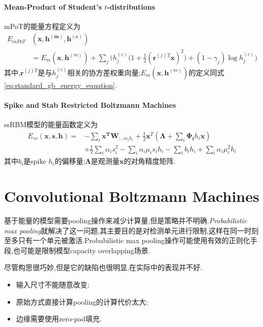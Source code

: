 \paragraph{Mean-Product of Student's $t$-distributions}

mPoT的能量方程定义为
\begin{equation}\begin{split}
E_{mPoT}&(\bm{x,h^{(m)},h^{(c)}})\\
&=E_m(\bm{x,h}^{(m)})+\sum_j\Big(h_j^{(c)}\Big(1+\frac{1}{2}(\bm r^{(j)T}\bm x)^2\Big)+(1-\gamma_j)\log h_j^{(c)}\Big)
\end{split}\end{equation}
其中,$\bm r^{(j)T}$是与$h_j^{(c)}$相关的协方差权重向量;$E_m(\bm{x,h}^{(m)})$的定义同式\ref{eq:standard_gb_energy_equation}.

\paragraph{Spike and Stab Restricted Boltzmann Machines}

ssRBM模型的能量函数定义为
\begin{equation}\begin{split}
E_{ss}(\bm{x,s,h})=&-\sum_i\bm{x^TW}_{:,is_ih_i}+\frac{1}{2}\bm x^T(\bm{\Lambda}+\sum_i\bm{\Phi_i}h_i\bm x)\\
&+\frac{1}{2}\sum_i\alpha_is_i^2-\sum_i\alpha_i\mu_is_ih_i-\sum_ib_ih_i+\sum_i\alpha_i\mu_i^2h_i
\end{split}\end{equation}
其中$b_i$是spike $h_i$的偏移量;$\bm\Lambda$是观测量$\bm x$的对角精度矩阵.

\section{Convolutional Boltzmann Machines}

基于能量的模型需要pooling操作来减少计算量,但是策略并不明确.\textit{Probabilistic max pooling}就解决了这一问题,其主要目的是对检测单元进行限制,这样在同一时刻至多只有一个单元被激活.Probabilistic max pooling操作可能使用有效的正则化手段,也可能是限制模型capacity overlapping场景.

尽管构思很巧妙,但是它的缺陷也很明显,在实际中的表现并不好.
\begin{itemize}
    \item 输入尺寸不能随意改变;
    \item 原始方式直接计算pooling的计算代价太大;
    \item 边缘需要使用zero-pad填充.
\end{itemize}

